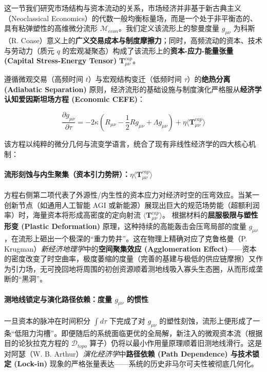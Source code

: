 这一节我们研究市场结构与资本流动的关系，市场经济并非基于新古典主义（Neoclassical Economics）的代数一般均衡标量场，而是一个处于非平衡态的、具有粘弹塑性的高维微分流形 $\mathcal{M}_{econ}$。我们定义该流形上的黎曼度量 $g_{\mu\nu}$ 为科斯（R. Coase）意义上的\textbf{广义交易成本与制度摩擦力}；同时，高频流动的资本、技术与劳动力（质元 $q$ 的宏观凝聚态）构成了该流形上的\textbf{资本-应力-能量张量 (Capital Stress-Energy Tensor)} $\mathbf{T}_{\mu\nu}^{cap}$。

遵循微观交易（高频时间 $t$）与宏观结构变迁（低频时间 $\tau$）的\textbf{绝热分离 (Adiabatic Separation)} 原则，经济流形的基础设施与制度演化严格服从\textbf{经济学认知爱因斯坦场方程 (Economic CEFE)}：

\begin{equation}
    \frac{\partial g_{\mu\nu}}{\partial \tau} = - 2\kappa \left( R_{\mu\nu} - \frac{1}{2}R g_{\mu\nu} + \Lambda g_{\mu\nu} \right) + \eta \langle \mathbf{T}_{\mu\nu}^{cap} \rangle
    \label{eq:economic_cefe}
\end{equation}

该方程以纯粹的微分几何与流变学语言，统合了现有非线性经济学的四大核心机制：

\paragraph{流形刻蚀与内生聚集（资本引力势阱）：$\eta \langle \mathbf{T}_{\mu\nu}^{cap} \rangle$}
方程右侧第二项代表了外源性/内生性的资本应力对经济时空的压弯效应。当某一创新节点（如通用人工智能 AGI 或新能源）展现出巨大的规范场势能（超额利润率）时，海量资本将形成高密度的定向射流 $\langle \mathbf{T}_{\mu\nu}^{cap} \rangle$。
根据材料的\textbf{屈服极限与塑性形变 (Plastic Deformation)} 原理，这种持续的高能轰击会压弯局部的度量 $g_{\mu\nu}$，在流形上砸出一个极深的“重力势井”。这在物理上精确对应了克鲁格曼（P. Krugman）\textit{新经济地理学}中的\textbf{空间聚集效应 (Agglomeration Effect)}——资本的密度改变了时空曲率，极度萎缩的度量（完善的基建与极低的供应链摩擦）又作为引力场，无可挽回地将周围的初创资源顺着测地线吸入寡头生态圈，从而形成垄断的“黑洞”。

\paragraph{测地线锁定与演化路径依赖：度量 $g_{\mu\nu}$ 的惯性}
一旦资本的脉冲在时间积分 $\int d\tau$ 下完成了对 $g_{\mu\nu}$ 的塑性刻蚀，流形上便形成了一条“低阻力沟槽”。即便随后的系统面临更优的全局解，新注入的微观资本流（根据目的论狄拉克方程的 $\mathcal{D}_{topo}$ 算子）仍将以最小作用量原理顺着旧测地线滑行。这是对阿瑟（W. B. Arthur）\textit{演化经济学}中\textbf{路径依赖 (Path Dependence) 与技术锁定 (Lock-in)} 现象的严格张量表达——系统的历史非马尔可夫性被彻底几何化。

